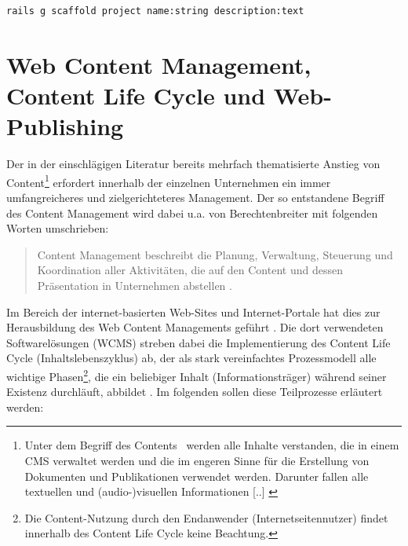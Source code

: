 \begin{lstlisting}[caption=Aufruf des Generators zur Erstellung einer MVC-Ressource Projekt]
rails g scaffold project name:string description:text
\end{lstlisting}



\section{Web Content Management, Content Life Cycle und Web-Publishing}
\label{sec:webpublishing}
Der in der einschlägigen Literatur bereits mehrfach thematisierte Anstieg von Content\footnote{
\glqq Unter dem Begriff des \flqq Contents\frqq~ werden alle Inhalte verstanden, die in einem CMS verwaltet werden und die im engeren Sinne für die Erstellung von Dokumenten und Publikationen verwendet werden. Darunter fallen alle textuellen und (audio-)visuellen Informationen [..] \citep[S. 297]{TechnischeDok}
} erfordert innerhalb der einzelnen Unternehmen ein immer umfangreicheres und zielgerichteteres Management. Der so entstandene Begriff des Content Management wird dabei u.a. von Berechtenbreiter mit folgenden Worten umschrieben:
\begin{quote}
Content Management beschreibt die Planung, Verwaltung, Steuerung und Koordination aller Aktivitäten, die auf den Content und dessen Präsentation in Unternehmen abstellen \cite{Berchtenbreiter}.
\end{quote}

Im Bereich der internet-basierten Web-Sites und Internet-Portale hat dies zur Herausbildung des Web Content Managements geführt \citep[][S. 3]{ecm}. Die dort verwendeten Softwarelösungen (WCMS) streben dabei die Implementierung des Content Life Cycle (Inhaltslebenszyklus) ab, der als stark vereinfachtes Prozessmodell alle wichtige Phasen\footnote{Die Content-Nutzung durch den Endanwender (Internetseitennutzer) findet innerhalb des Content Life Cycle keine Beachtung.}, die ein beliebiger Inhalt (Informationsträger) während seiner Existenz durchläuft, abbildet \citep[S.303]{TechnischeDok}. Im folgenden sollen diese Teilprozesse erläutert werden:

